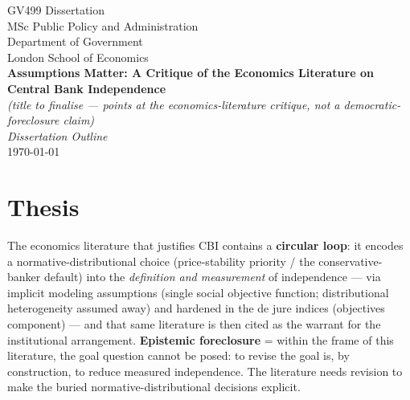 \documentclass[12pt,a4paper]{article}
\begin{document}
\begin{doublespace}

\thispagestyle{empty}
\begin{center}
    \vspace*{2cm}
    {\large GV499 Dissertation\\
    MSc Public Policy and Administration \\
    Department of Government\\
    London School of Economics}\\
    \vspace{2cm}
    {\Large\textbf{Assumptions Matter: A Critique of the Economics Literature on Central Bank Independence}}\\
    \vspace{0.5cm}
    {\small \textit{(title to finalise --- points at the economics-literature critique, not a democratic-foreclosure claim)}}\\
    \vspace{2cm}
    {\large \textit{Dissertation Outline}}\\
    \vspace{0.5cm}
    \today
\end{center}
\newpage

\setcounter{page}{1}


\section*{Thesis}
The economics literature that justifies CBI contains a \textbf{circular loop}: it encodes a normative-distributional choice (price-stability priority / the conservative-banker default) into the \textit{definition and measurement} of independence --- via implicit modeling assumptions (single social objective function; distributional heterogeneity assumed away) and hardened in the de jure indices (objectives component) --- and that same literature is then cited as the warrant for the institutional arrangement. \textbf{Epistemic foreclosure} = within the frame of this literature, the goal question cannot be posed: to revise the goal is, by construction, to reduce measured independence. The literature needs revision to make the buried normative-distributional decisions explicit.


\end{doublespace}
\end{document}
